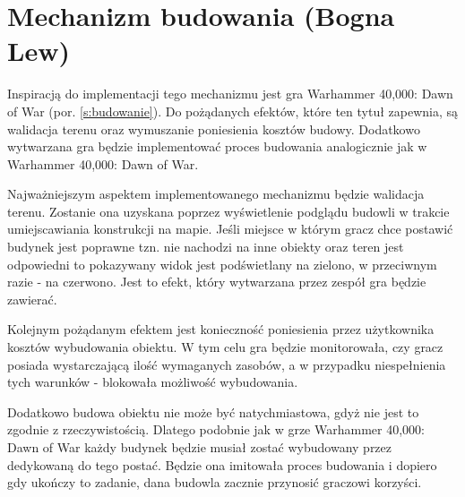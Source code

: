 \section{Mechanizm budowania (Bogna Lew)}\label{s:build_proj}
Inspiracją do implementacji tego mechanizmu jest gra Warhammer 40,000: Dawn of War (por. \ref{s:budowanie}). Do pożądanych
efektów, które ten tytuł zapewnia, są walidacja terenu oraz wymuszanie poniesienia kosztów budowy. Dodatkowo
wytwarzana gra będzie implementować proces budowania analogicznie jak w Warhammer 40,000: Dawn of War.

Najważniejszym aspektem implementowanego mechanizmu będzie walidacja terenu. Zostanie ona uzyskana poprzez wyświetlenie
podglądu budowli w trakcie umiejscawiania konstrukcji na mapie. Jeśli miejsce w którym gracz chce postawić budynek jest
poprawne tzn. nie nachodzi na inne obiekty oraz teren jest odpowiedni to pokazywany widok jest podświetlany na zielono,
w przeciwnym razie - na czerwono. Jest to efekt, który wytwarzana przez zespół gra będzie zawierać.

Kolejnym pożądanym efektem jest konieczność poniesienia przez użytkownika kosztów
wybudowania obiektu. W tym celu gra będzie monitorowała, czy gracz posiada wystarczającą ilość wymaganych zasobów, a w
przypadku niespełnienia tych warunków - blokowała możliwość wybudowania.

Dodatkowo budowa obiektu nie może być natychmiastowa, gdyż nie jest to zgodnie z rzeczywistością. Dlatego podobnie jak w
grze Warhammer 40,000: Dawn of War każdy budynek będzie musiał zostać wybudowany przez dedykowaną do tego postać. Będzie
ona imitowała proces budowania i dopiero gdy ukończy to zadanie, dana budowla zacznie przynosić graczowi korzyści.
